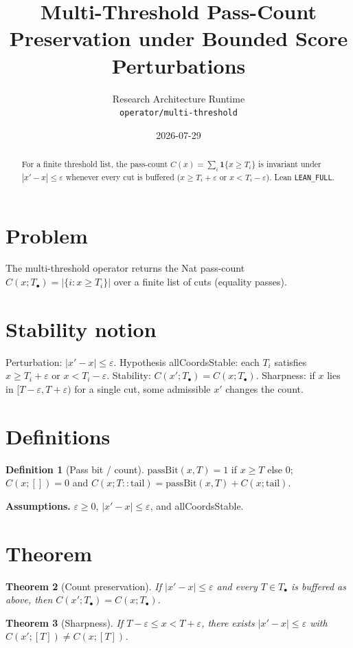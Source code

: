 \documentclass[12pt]{article}
\title{Multi-Threshold Pass-Count Preservation under Bounded Score Perturbations}
\author{Research Architecture Runtime\\[0.25em]
{\normalsize\texttt{operator/multi-threshold}}}
\date{2026-07-29}
\theoremstyle{plain}
\newtheorem{theorem}{Theorem}
\theoremstyle{definition}
\newtheorem{definition}[theorem]{Definition}
\theoremstyle{remark}
\begin{document}
\maketitle

\begin{abstract}
For a finite threshold list, the pass-count $C(x)=\sum_i \mathbf{1}\{x\ge T_i\}$ is invariant under $|x'-x|\le\varepsilon$ whenever every cut is buffered ($x\ge T_i+\varepsilon$ or $x<T_i-\varepsilon$). Lean \texttt{LEAN\_FULL}.
\end{abstract}

\noindent
\begin{center}
\end{center}
\vspace{0.6em}

\section{Problem}
{\raggedright\sloppy
The multi-threshold operator returns the Nat pass-count $C(x;T_\bullet)=|\{i:x\ge T_i\}|$ over a finite list of cuts (equality passes).
\par}

\section{Stability notion}
Perturbation: $|x'-x|\le\varepsilon$. Hypothesis allCoordsStable: each $T_i$ satisfies $x\ge T_i+\varepsilon$ or $x<T_i-\varepsilon$. Stability: $C(x';T_\bullet)=C(x;T_\bullet)$. Sharpness: if $x$ lies in $[T-\varepsilon,T+\varepsilon)$ for a single cut, some admissible $x'$ changes the count.

\section{Definitions}
\begin{definition}[Pass bit / count]
$\mathrm{passBit}(x,T)=1$ if $x\ge T$ else $0$; $C(x;[])=0$ and $C(x;T{::}\mathrm{tail})=\mathrm{passBit}(x,T)+C(x;\mathrm{tail})$.
\end{definition}
\noindent\textbf{Assumptions.} $\varepsilon\ge 0$, $|x'-x|\le\varepsilon$, and allCoordsStable.

\section{Theorem}
\begin{theorem}[Count preservation]\label{thm:inv}
If $|x'-x|\le\varepsilon$ and every $T\in T_\bullet$ is buffered as above, then $C(x';T_\bullet)=C(x;T_\bullet)$.
\end{theorem}
\begin{theorem}[Sharpness]\label{thm:sharp}
If $T-\varepsilon\le x<T+\varepsilon$, there exists $|x'-x|\le\varepsilon$ with $C(x';[T])\neq C(x;[T])$.
\end{theorem}
\end{document}
